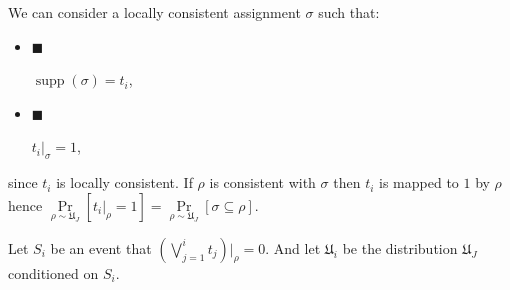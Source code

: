 We can consider a locally consistent assignment $\sigma$ such that:\par


\begin{itemize}


\item[] 
$\blacksquare$ 


$\operatorname*{supp}(\sigma)=t_{i}$,\par





\item[] 
$\blacksquare$ 


$t_{i}|_{\sigma}=1$,\par





\end{itemize}


since $t_{i}$ is locally consistent. If $\rho$ is consistent with $\sigma$ then $t_{i}$
is mapped to $1$ by $\rho$ hence $\Pr\limits_{\rho\sim\mathfrak{U}_{J}}[t_{i}|_{\rho}=1]=\Pr\limits_{\rho\sim%
\mathfrak{U}_{J}}[\sigma\subseteq\rho]$.\par




Let $S_{i}$ be an event that $\left(\bigvee\limits_{j=1}^{i}t_{j}\right)|_{\rho}=0$. And let
$\mathfrak{U}_{i}$ be the distribution $\mathfrak{U}_{J}$ conditioned on $S_{i}$.\par




